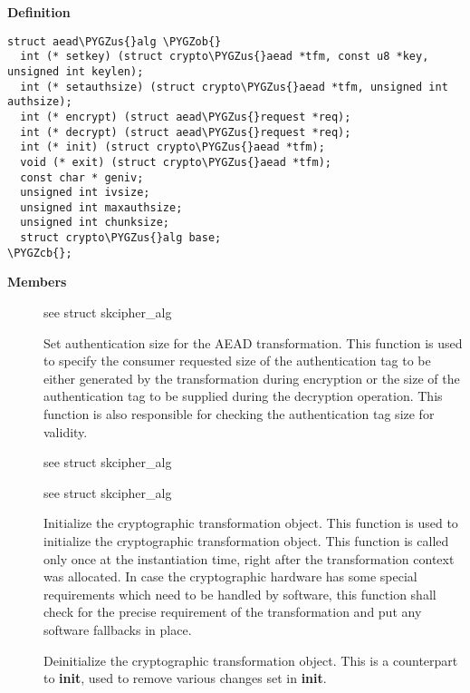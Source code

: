\documentclass[a4paper,8pt,english]{sphinxmanual}
\def\PYGZus{\char`\_}
\def\PYGZob{\char`\{}
\def\PYGZcb{\char`\}}
\begin{document}
\textbf{Definition}

\begin{Verbatim}[commandchars=\\\{\}]
struct aead\PYGZus{}alg \PYGZob{}
  int (* setkey) (struct crypto\PYGZus{}aead *tfm, const u8 *key, unsigned int keylen);
  int (* setauthsize) (struct crypto\PYGZus{}aead *tfm, unsigned int authsize);
  int (* encrypt) (struct aead\PYGZus{}request *req);
  int (* decrypt) (struct aead\PYGZus{}request *req);
  int (* init) (struct crypto\PYGZus{}aead *tfm);
  void (* exit) (struct crypto\PYGZus{}aead *tfm);
  const char * geniv;
  unsigned int ivsize;
  unsigned int maxauthsize;
  unsigned int chunksize;
  struct crypto\PYGZus{}alg base;
\PYGZcb{};
\end{Verbatim}

\textbf{Members}
\begin{description}
\item[{}] \leavevmode
see struct skcipher\_alg

\item[{}] \leavevmode
Set authentication size for the AEAD transformation. This
function is used to specify the consumer requested size of the
authentication tag to be either generated by the transformation
during encryption or the size of the authentication tag to be
supplied during the decryption operation. This function is also
responsible for checking the authentication tag size for
validity.

\item[{}] \leavevmode
see struct skcipher\_alg

\item[{}] \leavevmode
see struct skcipher\_alg

\item[{}] \leavevmode
Initialize the cryptographic transformation object. This function
is used to initialize the cryptographic transformation object.
This function is called only once at the instantiation time, right
after the transformation context was allocated. In case the
cryptographic hardware has some special requirements which need to
be handled by software, this function shall check for the precise
requirement of the transformation and put any software fallbacks
in place.

\item[{}] \leavevmode
Deinitialize the cryptographic transformation object. This is a
counterpart to \textbf{init}, used to remove various changes set in
\textbf{init}.


\end{description}
\end{document}
